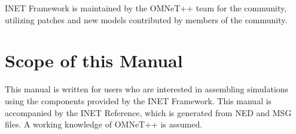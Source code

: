 INET Framework is maintained by the OMNeT++ team for the community, 
utilizing patches and new models contributed by members of the community.

\section{Scope of this Manual}

This manual is written for users who are interested in assembling
simulations using the components provided by the INET Framework.
This manual is accompanied by the INET Reference, which is generated from 
NED and MSG files. A working knowledge of OMNeT++ is assumed.



